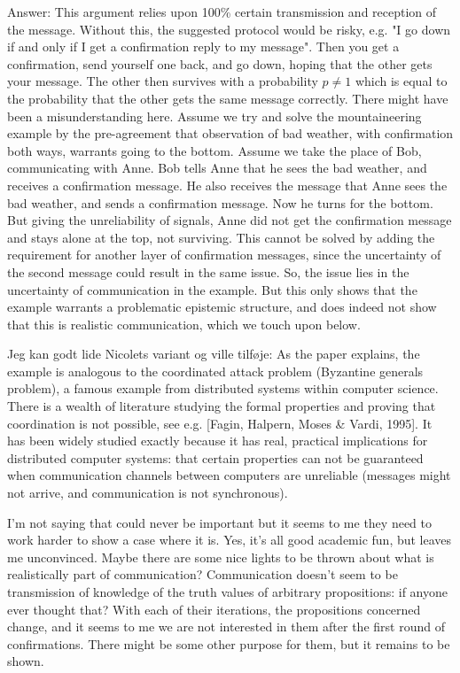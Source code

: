 \documentclass[a4paper]{article}
\newenvironment{robin}{\smallskip \noindent \color{red!10!green!50!blue}}{\color{black}\smallskip}
\newenvironment{tsn}{\smallskip \noindent \color{purple}}{\color{black}\smallskip}
\newenvironment{tobo}{\smallskip \noindent \color{yellow!80!black!80}}{\color{black}\smallskip}
\begin{document}
\begin{robin} Answer: This argument relies upon 100\% certain transmission and reception of the message. Without this, the suggested protocol would be risky,  e.g. "I go down if and only if I get a confirmation reply to my message". Then you get a confirmation, send yourself one back, and go down, hoping that the other gets your message. The other then survives with a probability $p\neq1$ which is equal to the probability that the other gets the same message correctly. 
\end{robin}
\begin{tsn}
There might have been a misunderstanding here. Assume we try and solve the mountaineering example by the pre-agreement that observation of bad weather, with confirmation both ways, warrants going to the bottom. Assume we take the place of Bob, communicating with Anne. Bob tells Anne that he sees the bad weather, and receives a confirmation message. He also receives the message that Anne sees the bad weather, and sends a confirmation message. Now he turns for the bottom. But giving the unreliability of signals, Anne did not get the confirmation message and stays alone at the top, not surviving. This cannot be solved by adding the requirement for another layer of confirmation messages, since the uncertainty of the second message could result in the same issue. So, the issue lies in the uncertainty of communication in the example. But this only shows that the example warrants a problematic epistemic structure, and does indeed not show that this is realistic communication, which we touch upon below.
\end{tsn}

\begin{tobo}
Jeg kan godt lide Nicolets variant og ville tilføje: As the paper explains, the example is analogous to the coordinated attack problem (Byzantine generals problem), a famous example from distributed systems within computer science. There is a wealth of literature studying the formal properties and proving that coordination is not possible, see e.g. [Fagin, Halpern, Moses \& Vardi, 1995]. It has been widely studied exactly because it has real, practical implications for distributed computer systems: that certain properties can not be guaranteed when communication channels between computers are unreliable (messages might not arrive, and communication is not synchronous).
\end{tobo}

I'm not saying that could never be important but it seems to me they need to work harder to show a case where it is. Yes, it's all good academic fun, but leaves me unconvinced. Maybe there are some nice lights to be thrown about what is realistically part of communication? Communication doesn't seem to be transmission of knowledge of the truth values of arbitrary propositions: if anyone ever thought that? With each of their iterations, the propositions concerned change, and it seems to me we are not interested in them after the first round of confirmations. There might be some other purpose for them, but it remains to be shown.
\end{document}
